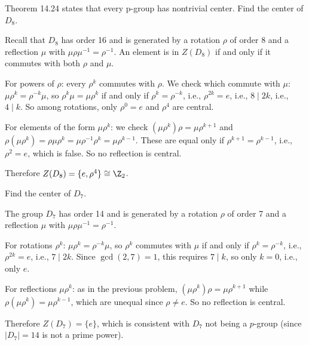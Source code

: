 
\begin{problem}[14.4]
  Theorem 14.24 states that every p-group has nontrivial center. Find the center of $D_8$.
\end{problem}

\begin{solution}
  Recall that $D_8$ has order 16 and is generated by a rotation $\rho$ of order 8 and a reflection $\mu$ with $\mu\rho\mu^{-1} = \rho^{-1}$. An element is in $Z(D_8)$ if and only if it commutes with both $\rho$ and $\mu$.

  For powers of $\rho$: every $\rho^k$ commutes with $\rho$. We check which commute with $\mu$: $\mu\rho^k = \rho^{-k}\mu$, so $\rho^k\mu = \mu\rho^k$ if and only if $\rho^k = \rho^{-k}$, i.e., $\rho^{2k} = e$, i.e., $8 \mid 2k$, i.e., $4 \mid k$. So among rotations, only $\rho^0 = e$ and $\rho^4$ are central.

  For elements of the form $\mu\rho^k$: we check $(\mu\rho^k)\rho = \mu\rho^{k+1}$ and $\rho(\mu\rho^k) = \rho\mu\rho^k = \mu\rho^{-1}\rho^k = \mu\rho^{k-1}$. These are equal only if $\rho^{k+1} = \rho^{k-1}$, i.e., $\rho^2 = e$, which is false. So no reflection is central.

  Therefore $Z(D_8) = \{e, \rho^4\} \cong \Z_2$.
\end{solution}

\begin{problem}[14.5]
  Find the center of $D_7$.
\end{problem}

\begin{solution}
  The group $D_7$ has order 14 and is generated by a rotation $\rho$ of order 7 and a reflection $\mu$ with $\mu\rho\mu^{-1} = \rho^{-1}$.

  For rotations $\rho^k$: $\mu\rho^k = \rho^{-k}\mu$, so $\rho^k$ commutes with $\mu$ if and only if $\rho^k = \rho^{-k}$, i.e., $\rho^{2k} = e$, i.e., $7 \mid 2k$. Since $\gcd(2, 7) = 1$, this requires $7 \mid k$, so only $k = 0$, i.e., only $e$.

  For reflections $\mu\rho^k$: as in the previous problem, $(\mu\rho^k)\rho = \mu\rho^{k+1}$ while $\rho(\mu\rho^k) = \mu\rho^{k-1}$, which are unequal since $\rho \neq e$. So no reflection is central.

  Therefore $Z(D_7) = \{e\}$, which is consistent with $D_7$ not being a $p$-group (since $|D_7| = 14$ is not a prime power).
\end{solution}

